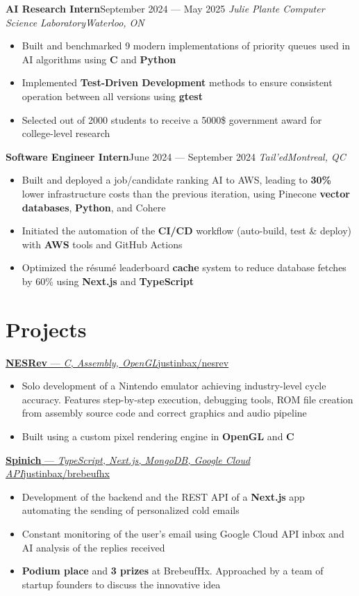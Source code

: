 \documentclass{article}
\newcommand{\newrole}[4]{
    {\normalfont\textbf{#1}\hfill#3}
    \newline
    \textit{#2}\hfill\textit{#4}
}
\newcommand{\shortlinkrole}[4]{
    {\href{#3}{\normalfont\textbf{#1} --- \textit{#2}\hfill#4\:\faExternalLink}\vspace*{-4pt}}
}
\newenvironment{bulletpoints}{\begin{itemize}\setlength\itemsep{-0.2em}}{\end{itemize}}
\begin{document}
\newrole{AI Research Intern}{Julie Plante Computer Science Laboratory}{September 2024 --- May 2025}{Waterloo, ON}
\begin{bulletpoints}
    \item Built and benchmarked 9 modern implementations of priority queues used in AI algorithms using \textbf{C} and \textbf{Python}
    \item Implemented \textbf{Test-Driven Development} methods to ensure consistent operation between all versions using \textbf{gtest}
    \item Selected out of 2000 students to receive a 5000\$ government award for college-level research
\end{bulletpoints}

\newrole{Software Engineer Intern}{Tail'ed}{June 2024 --- September 2024}{Montreal, QC}
\begin{bulletpoints}
    \item Built and deployed a job/candidate ranking AI to AWS, leading to \textbf{30\%} lower infrastructure costs than the previous iteration, using Pinecone \textbf{vector databases}, \textbf{Python}, and Cohere
    \item Initiated the automation of the \textbf{CI/CD} workflow (auto-build, test \& deploy) with \textbf{AWS} tools and GitHub Actions
    \item Optimized the résumé leaderboard \textbf{cache} system to reduce database fetches by 60\% using \textbf{Next.js} and \textbf{TypeScript}
\end{bulletpoints}


\section*{Projects}

\shortlinkrole{NESRev}{C, Assembly, OpenGL}{https://github.com/justinbax/nesrev}{justinbax/nesrev}
\begin{bulletpoints}
    \item Solo development of a Nintendo emulator achieving industry-level cycle accuracy. Features step-by-step execution, debugging tools, ROM file creation from assembly source code and correct graphics and audio pipeline
    \item Built using a custom pixel rendering engine in \textbf{OpenGL} and \textbf{C}
\end{bulletpoints}

\shortlinkrole{Spinich}{TypeScript, Next.js, MongoDB, Google Cloud API}{https://github.com/justinbax/brebeufhx}{justinbax/brebeufhx}
\begin{bulletpoints}
    \item Development of the backend and the REST API of a \textbf{Next.js} app automating the sending of personalized cold emails
    \item Constant monitoring of the user's email using Google Cloud API inbox and AI analysis of the replies received
    \item \textbf{Podium place} and \textbf{3 prizes} at BrebeufHx. Approached by a team of startup founders to discuss the innovative idea
\end{bulletpoints}
\end{document}
